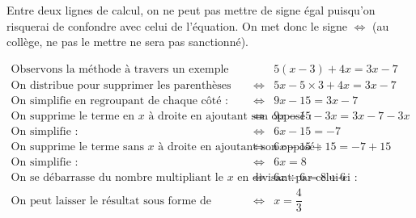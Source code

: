 Entre deux lignes de calcul, on ne peut pas mettre de signe égal puisqu'on risquerai de confondre avec celui de l'équation. On met donc le signe $\iff$ (au collège, ne pas le mettre ne sera pas sanctionné).

\begin{align*}
    \text{Observons la méthode à travers un exemple :}& & &5(x-3)+4x=3x-7\\
    \text{On distribue pour supprimer les parenthèses :}& & \iff & 5x-5\times 3 +4x =3x-7\\
    \text{On simplifie en regroupant de chaque côté :}& & \iff & 9x-15=3x-7\\
    \text{On supprime le terme en $x$ à droite en ajoutant son opposé :} & & \iff & 9x-15-3x=3x-7-3x\\
    \text{On simplifie :}& & \iff &6x-15=-7\\
    \text{On supprime le terme sans $x$ à droite en ajoutant son opposé :}& & \iff &6x-15 +15=-7+15\\
    \text{On simplifie :}& &\iff & 6x=8\\
    \text{On se débarrasse du nombre multipliant le $x$ en divisant par celui-ci :} && \iff &6x\div 6=8\div 6\\
    \text{On peut laisser le résultat sous forme de fraction simplifié :} &&\iff &x=\dfrac{4}{3}
\end{align*}